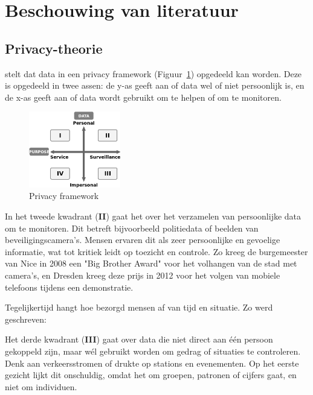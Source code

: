 \documentclass[nonacm, sigconf, balance=true]{acmart}
\begin{document}
    \section{Beschouwing van literatuur}

    \subsection{Privacy-theorie}\label{subsec:privacy-theorie}
    \parencite{van2016privacy} stelt dat data in een privacy framework (Figuur~\ref{fig:privacy_framework}) opgedeeld kan worden.
    Deze is opgedeeld in twee assen: de y-as geeft aan of data wel of niet persoonlijk is, en de x-as geeft aan of data wordt gebruikt om te helpen of om te monitoren.

    \begin{figure}[h]
        \centering
        \includegraphics[width=40mm]{images/SmartCityPrivacy}
        \caption{Privacy framework {}}
        \label{fig:privacy_framework}
    \end{figure}

    In het tweede kwadrant (\textbf{II}) gaat het over het verzamelen van persoonlijke data om te monitoren.
    Dit betreft bijvoorbeeld politiedata of beelden van beveiligingscamera's.
    Mensen ervaren dit als zeer persoonlijke en gevoelige informatie, wat tot kritiek leidt op toezicht en controle.
    Zo kreeg de burgemeester van Nice in 2008 een "Big Brother Award" voor het volhangen van de stad met camera's, en Dresden kreeg deze prijs in 2012 voor het volgen van mobiele telefoons tijdens een demonstratie.

    Tegelijkertijd hangt hoe bezorgd mensen af van tijd en situatie.
    Zo werd geschreven:

    Het derde kwadrant (\textbf{III}) gaat over data die niet direct aan één persoon gekoppeld zijn, maar wél gebruikt worden om gedrag of situaties te controleren.
    Denk aan verkeersstromen of drukte op stations en evenementen.
    Op het eerste gezicht lijkt dit onschuldig, omdat het om groepen, patronen of cijfers gaat, en niet om individuen.
\end{document}
